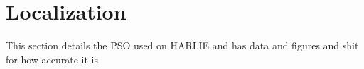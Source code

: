 \section{Localization}\label{sec:localization}

This section details the PSO used on HARLIE and has data and figures and shit for how accurate it is
